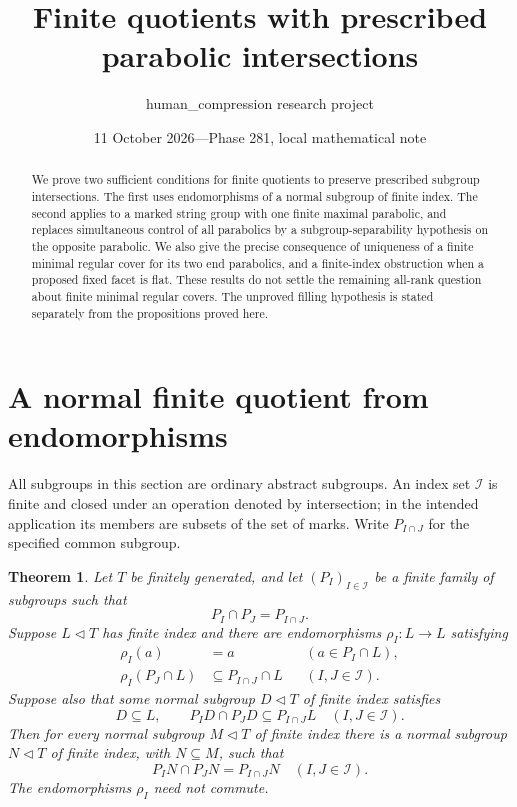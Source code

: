 \documentclass[11pt]{article}
\title{Finite quotients with prescribed parabolic intersections}
\author{human\_compression research project}
\date{11 October 2026\quad---\quad Phase 281, local mathematical note}
\newtheorem{theorem}{Theorem}[section]
\theoremstyle{remark}\newtheorem{remark}[theorem]{Remark}
\begin{document}
\maketitle
\begin{abstract}
We prove two sufficient conditions for finite quotients to preserve prescribed
subgroup intersections. The first uses endomorphisms of a normal subgroup of
finite index. The second applies to a marked string group with one finite
maximal parabolic, and replaces simultaneous control of all parabolics by a
subgroup-separability hypothesis on the opposite parabolic. We also give the
precise consequence of uniqueness of a finite minimal regular cover for its
two end parabolics, and a finite-index obstruction when a proposed fixed facet
is flat. These results do not settle the remaining all-rank question about
finite minimal regular covers. The unproved filling hypothesis is stated
separately from the propositions proved here.
\end{abstract}

\section{A normal finite quotient from endomorphisms}

All subgroups in this section are ordinary abstract subgroups. An index set
\(\mathcal I\) is finite and closed under an operation denoted by intersection;
in the intended application its members are subsets of the set of marks.
Write \(P_{I\cap J}\) for the specified common subgroup.

\begin{theorem}\label{thm:normal}
Let \(T\) be finitely generated, and let \((P_I)_{I\in\mathcal I}\) be a finite
family of subgroups such that
\[
 P_I\cap P_J=P_{I\cap J}.
\]
Suppose \(L\lhd T\) has finite index and there are endomorphisms
\(\rho_I:L\to L\) satisfying
\begin{align}
 \rho_I(a)&=a &&(a\in P_I\cap L),\label{eq:fix}\\
 \rho_I(P_J\cap L)&\subseteq P_{I\cap J}\cap L
      &&(I,J\in\mathcal I).\label{eq:cross}
\end{align}
Suppose also that some normal subgroup \(D\lhd T\) of finite index satisfies
\begin{equation}\label{eq:approx}
 D\subseteq L,\qquad
 P_ID\cap P_JD\subseteq P_{I\cap J}L
       \quad(I,J\in\mathcal I).
\end{equation}
Then for every normal subgroup \(M\lhd T\) of finite index there is a normal
subgroup \(N\lhd T\) of finite index, with \(N\subseteq M\), such that
\begin{equation}\label{eq:exact}
 P_IN\cap P_JN=P_{I\cap J}N\quad(I,J\in\mathcal I).
\end{equation}
The endomorphisms \(\rho_I\) need not commute.
\end{theorem}
\end{document}
